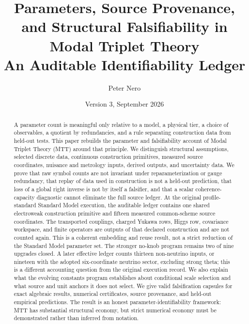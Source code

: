 \documentclass[11pt]{article}
\title{\textbf{Parameters, Source Provenance, and Structural Falsifiability in Modal Triplet Theory}\\
\large An Auditable Identifiability Ledger}
\author{Peter Nero}
\date{Version 3, September 2026}
\begin{document}
\maketitle

\begin{abstract}
A parameter count is meaningful only relative to a model, a physical tier, a
choice of observables, a quotient by redundancies, and a rule separating
construction data from held-out tests. This paper rebuilds the parameter and
falsifiability account of Modal Triplet Theory (MTT) around that principle.
We distinguish structural assumptions, selected discrete data, continuous
construction primitives, measured source coordinates, nuisance and metrology
inputs, derived outputs, and uncertainty data. We prove that raw symbol
counts are not invariant under reparameterization or gauge redundancy, that
replay of data used in construction is not a held-out prediction, that loss
of a global right inverse is not by itself a falsifier, and that a scalar
coherence-capacity diagnostic cannot eliminate the full source ledger.
At the original profile-standard Standard Model execution, the auditable ledger
contains one shared electroweak construction primitive and fifteen measured
common-scheme source coordinates. The transported couplings, charged Yukawa
rows, Higgs row, covariance workspace, and finite operators are outputs of
that declared construction and are not counted again. This is a coherent
embedding and reuse result, not a strict reduction of the Standard Model
parameter set. The stronger no-knob program remains two of nine upgrades
closed. A later effective ledger counts thirteen non-neutrino inputs, or
nineteen with the adopted six-coordinate neutrino sector, excluding strong
theta; this is a different accounting question from the original execution
record. We also explain what the evolving constants program establishes
about conditional scale selection and what source and unit anchors it does
not select. We give valid falsification capsules for exact algebraic results,
numerical certificates, source provenance, and held-out empirical
predictions. The result is an honest parameter-identifiability framework:
MTT has substantial structural economy, but strict numerical economy must be
demonstrated rather than inferred from notation.
\end{abstract}
\end{document}
